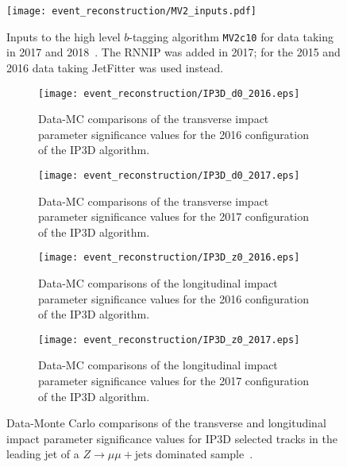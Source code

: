 \begin{figure}[htbp]
 \centering
 \centering
 \texttt{[image: event\_reconstruction/MV2\_inputs.pdf]}
 \caption[Inputs to the high level $b$-tagging algorithm \texttt{MV2c10} for data taking in 2017 and 2018.]{%
  Inputs to the high level $b$-tagging algorithm \texttt{MV2c10} for data taking in 2017 and 2018~\cite{Feickert:ML4Jets2018}.
  The RNNIP was added in 2017; for the 2015 and 2016 data taking JetFitter was used instead.}
 \label{fig:MV2_inputs}
\end{figure}

\begin{figure}[htbp]
 \centering
 \begin{subfigure}[t]{0.48\textwidth}
  \centering
  \texttt{[image: event\_reconstruction/IP3D\_d0\_2016.eps]}
  \caption[Transverse impact parameter significance values for the 2016 configuration of the IP3D algorithm.]{%
   Data-MC comparisons of the transverse impact parameter significance values for the 2016 configuration of the IP3D algorithm.}
  \label{fig:IP3D_d0_2016}
 \end{subfigure}%
 \quad
 \begin{subfigure}[t]{0.48\textwidth}
  \centering
  \texttt{[image: event\_reconstruction/IP3D\_d0\_2017.eps]}
  \caption[Transverse impact parameter significance values for the 2017 configuration of the IP3D algorithm.]{%
   Data-MC comparisons of the transverse impact parameter significance values for the 2017 configuration of the IP3D algorithm.}
  \label{fig:IP3D_d0_2017}
 \end{subfigure}%

 \begin{subfigure}[t]{0.48\textwidth}
  \centering
  \texttt{[image: event\_reconstruction/IP3D\_z0\_2016.eps]}
  \caption[Longitudinal impact parameter significance values for the 2016 configuration of the IP3D algorithm.]{%
   Data-MC comparisons of the longitudinal impact parameter significance values for the 2016 configuration of the IP3D algorithm.}
  \label{fig:IP3D_z0_2016}
 \end{subfigure}%
 \quad
 \begin{subfigure}[t]{0.48\textwidth}
  \centering
  \texttt{[image: event\_reconstruction/IP3D\_z0\_2017.eps]}
  \caption[Longitudinal impact parameter significance values for the 2017 configuration of the IP3D algorithm.]{%
   Data-MC comparisons of the longitudinal impact parameter significance values for the 2017 configuration of the IP3D algorithm.}
  \label{fig:IP3D_z0_2017}
 \end{subfigure}%
 \caption[Data-Monte Carlo comparisons of the transverse and longitudinal impact parameter significance values for IP3D selected tracks in the leading jet of the $Z\to\mu\mu + \textrm{jets}$ dominated sample.]{%
  Data-Monte Carlo comparisons of the transverse and longitudinal impact parameter significance values for IP3D selected tracks in the leading jet of a $Z\to\mu\mu + \textrm{jets}$ dominated sample~\cite{ATL-PHYS-PUB-2017-013}.}
 \label{fig:signed_impact_parameters}
\end{figure}


